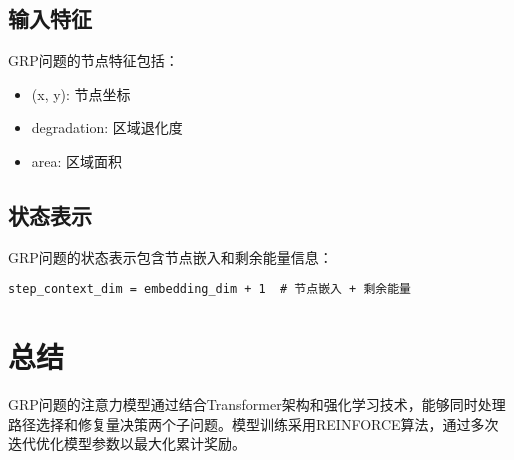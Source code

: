 \documentclass[10pt,a4paper]{article}
\begin{document}
\subsection{输入特征}
GRP问题的节点特征包括：
\begin{itemize}
    \item (x, y): 节点坐标
    \item degradation: 区域退化度
    \item area: 区域面积
\end{itemize}

\subsection{状态表示}
GRP问题的状态表示包含节点嵌入和剩余能量信息：
\begin{verbatim}
step_context_dim = embedding_dim + 1  # 节点嵌入 + 剩余能量
\end{verbatim}

\section{总结}

GRP问题的注意力模型通过结合Transformer架构和强化学习技术，能够同时处理路径选择和修复量决策两个子问题。模型训练采用REINFORCE算法，通过多次迭代优化模型参数以最大化累计奖励。
\end{document}

